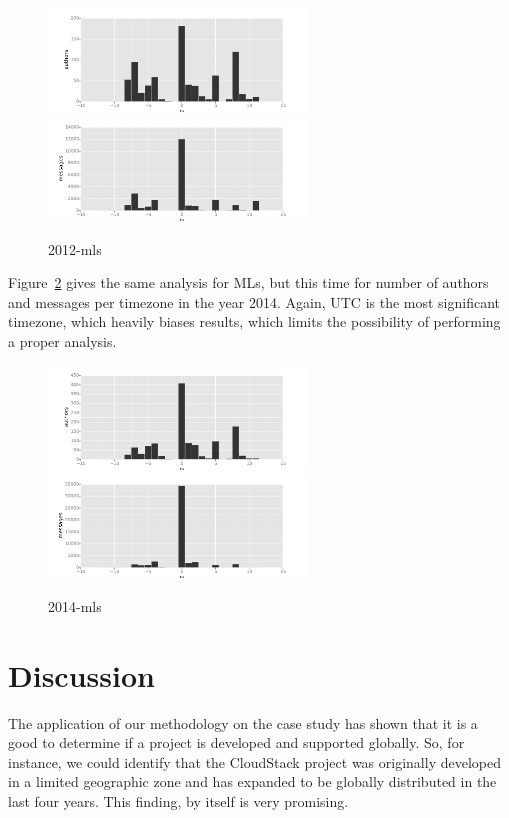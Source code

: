 \documentclass{sig-alternate-05-2015}
\begin{document}
\begin{figure}[!h]
\centering
\includegraphics[width=6.9cm]{figs/cloudstack/tz-mls-authors-2012.pdf}
\includegraphics[width=6.9cm]{figs/cloudstack/tz-mls-messages-2012.pdf}
\caption{2012-mls}
\label{fig:2012-mls}
\end{figure}

Figure~\ref{fig:2014-mls} gives the same analysis for MLs,
but this time for number of authors and messages per timezone in the year
2014. Again, UTC is the most significant timezone, which heavily biases results,
which limits the possibility of performing a proper analysis.

\begin{figure}[!h]
\centering
\includegraphics[width=6.9cm]{figs/cloudstack/tz-mls-authors-2014.pdf}
\includegraphics[width=6.9cm]{figs/cloudstack/tz-mls-messages-2014.pdf}
\caption{2014-mls}
\label{fig:2014-mls}
\end{figure}


\section{Discussion}
\label{sec:discussion}

The application of our methodology on the case study has shown that it
is a good to determine if a project is developed and supported globally. 
So, for instance, we could identify that the CloudStack project was
originally developed in a limited geographic zone and has expanded to 
be globally distributed in the last four years. This finding, by itself
is very promising.
\end{document}
